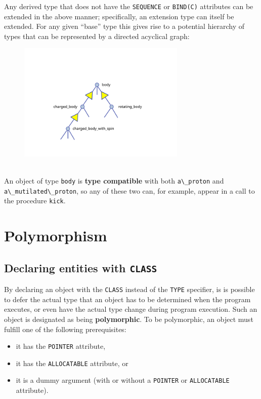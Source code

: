 \documentclass[
  paper=a4,
  ,captions=tableheading
]{scrartcl}
\newcommand{\passthrough}[1]{#1}
\providecommand{\tightlist}{%
  \setlength{\itemsep}{0pt}\setlength{\parskip}{0pt}}
\begin{document}
Any derived type that does not have the
\passthrough{\lstinline!SEQUENCE!} or \passthrough{\lstinline!BIND(C)!}
attributes can be extended in the above manner; specifically, an
extension type can itself be extended. For any given ``base'' type this
gives rise to a potential hierarchy of types that can be represented by
a directed acyclical graph:

\begin{figure}
\centering
\includegraphics[width=8cm,height=\textheight,keepaspectratio]{Inheritance_diagram.svg.png}
\caption{~}
\end{figure}

An object of type \passthrough{\lstinline!body!} is \textbf{type
compatible} with both \passthrough{\lstinline!a\_proton!} and
\passthrough{\lstinline!a\_mutilated\_proton!}, so any of these two can,
for example, appear in a call to the procedure
\passthrough{\lstinline!kick!}.

\section{Polymorphism}\label{polymorphism}

\subsection{\texorpdfstring{Declaring entities with
\texttt{CLASS}}{Declaring entities with CLASS}}\label{declaring-entities-with-class}

By declaring an object with the \passthrough{\lstinline!CLASS!} instead
of the \passthrough{\lstinline!TYPE!} specifier, is is possible to defer
the actual type that an object has to be determined when the program
executes, or even have the actual type change during program execution.
Such an object is designated as being \textbf{polymorphic}. To be
polymorphic, an object must fulfill one of the following prerequisites:

\begin{itemize}
\tightlist
\item
  it has the \passthrough{\lstinline!POINTER!} attribute,
\item
  it has the \passthrough{\lstinline!ALLOCATABLE!} attribute, or
\item
  it is a dummy argument (with or without a
  \passthrough{\lstinline!POINTER!} or
  \passthrough{\lstinline!ALLOCATABLE!} attribute).
\end{itemize}
\end{document}
